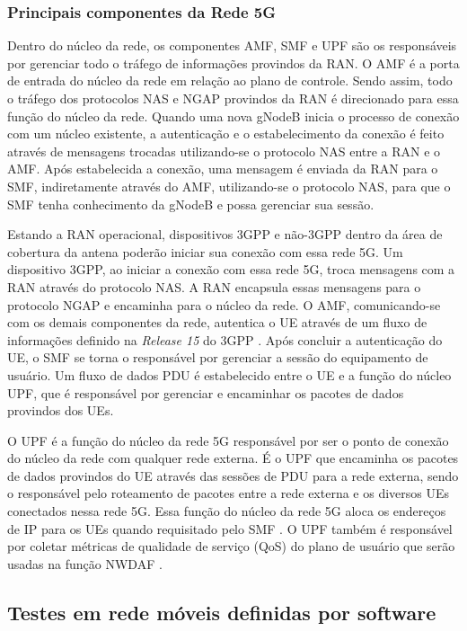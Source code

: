 \subsubsection{Principais componentes da Rede 5G}
\label{subsec:components}

Dentro do núcleo da rede, os componentes AMF, SMF e UPF são os responsáveis por gerenciar todo o tráfego de informações provindos da RAN.
O AMF é a porta de entrada do núcleo da rede em relação ao plano de controle.
Sendo assim, todo o tráfego dos protocolos NAS e NGAP provindos da RAN é direcionado para essa função do núcleo da rede.
Quando uma nova gNodeB inicia o processo de conexão com um núcleo existente, a autenticação e o estabelecimento da conexão é feito através de mensagens trocadas utilizando-se o protocolo NAS entre a RAN e o AMF.
Após estabelecida a conexão, uma mensagem é enviada da RAN para o SMF, indiretamente através do AMF, utilizando-se o protocolo NAS, para que o SMF tenha conhecimento da gNodeB e possa gerenciar sua sessão.

Estando a RAN operacional, dispositivos 3GPP e não-3GPP dentro da área de cobertura da antena poderão iniciar sua conexão com essa rede 5G. Um dispositivo 3GPP, ao iniciar a conexão com essa rede 5G, troca mensagens com a RAN através do protocolo NAS. A RAN encapsula essas mensagens para o protocolo NGAP e encaminha para o núcleo da rede. O AMF, comunicando-se com os demais componentes da rede, autentica o UE através de um fluxo de informações definido na \textit{Release 15} do 3GPP \cite{3gpp.29.509}. Após concluir a autenticação do UE, o SMF se torna o responsável por gerenciar a sessão do equipamento de usuário. Um fluxo de dados PDU é estabelecido entre o UE e a função do núcleo UPF, que é responsável por gerenciar e encaminhar os pacotes de dados provindos dos UEs.

O UPF é a função do núcleo da rede 5G responsável por ser o ponto de conexão do núcleo da rede com qualquer rede externa.
É o UPF que encaminha os pacotes de dados provindos do UE através das sessões de PDU para a rede externa, sendo o responsável pelo roteamento de pacotes entre a rede externa e os diversos UEs conectados nessa rede 5G.
Essa função do núcleo da rede 5G aloca os endereços de IP para os UEs quando requisitado pelo SMF \cite{3gpp.23.501}.
O UPF também é responsável por coletar métricas de qualidade de serviço (QoS) do plano de usuário que serão usadas na função NWDAF \cite{3gpp.23.548}.

\subsection{Testes em rede móveis definidas por software}


